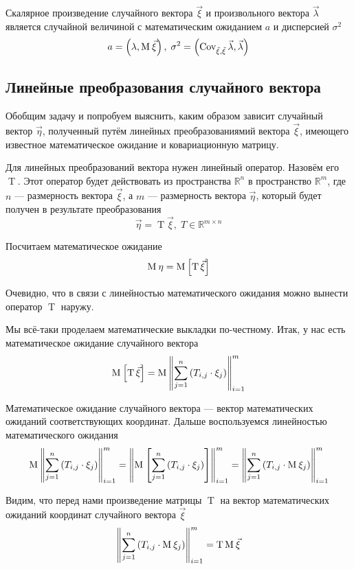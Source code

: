 \begin{affirmation}\label{affirmation:scalarMulTransformations}
    Скалярное произведение случайного вектора $\vec{\xi}$ и произвольного
    вектора $\vec{\lambda}$ является случайной величиной с математическим
    ожиданием $a$ и дисперсией $\sigma^2$
    $$a = \left( \lambda, \operatorname{M}_{} \vec{\xi} \right),\;
        \sigma^2
            = \left( \operatorname{Cov^{}_{\vec{\xi}, \vec{\xi}}} \vec{\lambda}, \vec{\lambda} \right)$$
\end{affirmation}

\subsection{Линейные преобразования случайного вектора}
Обобщим задачу и попробуем выяснить, каким образом зависит случайный вектор
$\vec{\eta}$, полученный путём линейных преобразованиямий вектора $\vec{\xi}$,
имеющего известное математическое ожидание и ковариационную матрицу.

Для линейных преобразований вектора нужен линейный оператор. Назовём его
$\operatorname{T}$. Этот оператор будет действовать из пространства
$\mathbb{R}^n$
в пространство $\mathbb{R}^m$, где $n$ --- размерность вектора $\vec{\xi}$,
а $m$ --- размерность вектора $\vec{\eta}$, который будет получен
в результате преобразования
$$\vec{\eta} = \operatorname{T} \vec{\xi} ,\; T \in \mathbb{R}^{m \times n}$$

Посчитаем математическое ожидание
$$\operatorname{M}_{} \eta = \operatorname{M}_{} \left[ \operatorname{T} \vec{\xi}  \right]$$

Очевидно, что в связи с линейностью математического ожидания можно вынести
оператор $\operatorname{T}$ наружу.

Мы всё-таки проделаем математические выкладки по-честному.
Итак, у нас есть математическое ожидание случайного вектора
$$\operatorname{M}_{} \left[ \operatorname{T} \vec{\xi}  \right]
    = \operatorname{M}_{} \left\| \sum_{j=1}^n \left( T_{i,j} \cdot \xi_j \right)
        \right\|_{i=1}^m$$

Математическое ожидание случайного вектора --- вектор математических ожиданий
соответствующих координат.
Дальше воспользуемся линейностью математического ожидания
$$\operatorname{M}_{} \left\| \sum_{j=1}^n \left( T_{i,j} \cdot \xi_j \right)
        \right\|_{i=1}^m
    = \left\| \operatorname{M}_{} \left[ \sum_{j=1}^n \left( T_{i,j} \cdot \xi_j \right) \right]
        \right\|_{i=1}^m
    = \left\| \sum_{j=1}^n \left( T_{i,j} \cdot \operatorname{M}_{} \xi_j \right)
        \right\|_{i=1}^m$$

Видим, что перед нами произведение матрицы $\operatorname{T}$ на вектор
математических ожиданий координат случайного вектора $\vec{\xi}$
$$\left\| \sum_{j=1}^n \left( T_{i,j} \cdot \operatorname{M}_{} \xi_j \right)
    \right\|_{i=1}^m = \operatorname{T} \operatorname{M}_{} \vec{\xi} $$

